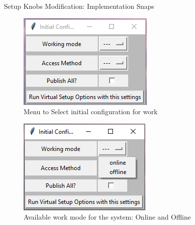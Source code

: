 \begin{frame}[allowframebreaks]{Setup Knobs Modification: Implementation Snaps}
    
    \begin{figure}[htbp]
        \centering
        \includegraphics[width=0.6\linewidth]{Im/figures/proposed-work/bios-gui-initial-config}
        \caption{Menu to Select initial configuration for work}\label{fig:proposed-work-bios-gui-initial-config}
    \end{figure}
    
    \begin{figure}[htbp]
        \centering
        \includegraphics[width=0.6\linewidth]{Im/figures/proposed-work/bios-gui-initial-config-select-mode}
        \caption{Available work mode for the system: Online and Offline}\label{fig:proposed-work-bios-gui-initial-config-select-mode}
    \end{figure}

%
\end{frame}

